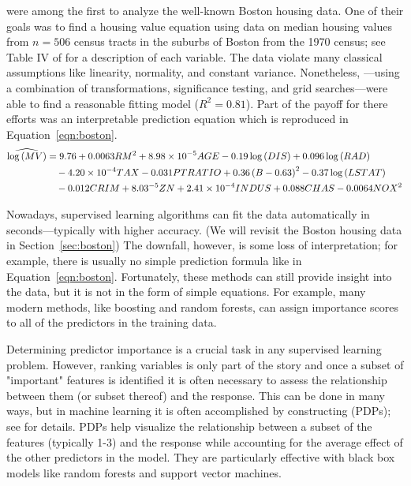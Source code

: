 \citet{harrison-1978-hedonic} were among the first to analyze the well-known Boston housing data. One of their goals was to find a housing value equation using data on median housing values from $n = 506$ census tracts in the suburbs of Boston from the 1970 census; see Table IV of \citet{harrison-1978-hedonic} for a description of each variable. The data violate many classical assumptions like linearity, normality, and constant variance. Nonetheless, \citeauthor{harrison-1978-hedonic}---using a combination of transformations, significance testing, and grid searches---were able to find a reasonable fitting model ($R^2 = 0.81$). Part of the payoff for there efforts was an interpretable prediction equation which is reproduced in Equation~\eqref{eqn:boston}.
\begin{equation}
\label{eqn:boston}
\begin{split}
\widehat{\log\left(MV\right)} &= 9.76 + 0.0063 RM^2 + 8.98\times10^{-5} AGE - 0.19\log\left(DIS\right) + 0.096\log\left(RAD\right) \\
  & \quad - 4.20\times10^{-4} TAX - 0.031 PTRATIO + 0.36\left(B - 0.63\right)^2 - 0.37\log\left(LSTAT\right) \\
  & \quad - 0.012 CRIM + 8.03\time10^{-5} ZN + 2.41\times10^{-4}  INDUS + 0.088 CHAS - 0.0064 NOX^2
\end{split}
\end{equation}

Nowadays, supervised learning algorithms can fit the data automatically in seconds---typically with higher accuracy. (We will revisit the Boston housing data in Section~\ref{sec:boston}) The downfall, however, is some loss of interpretation; for example, there is usually no simple prediction formula like in Equation~\eqref{eqn:boston}. Fortunately, these methods can still provide insight into the data, but it is not in the form of simple equations. For example, many modern methods, like boosting and random forests, can assign importance scores to all of the predictors in the training data.

Determining predictor importance is a crucial task in any supervised learning problem. However, ranking variables is only part of the story and once a subset of "important" features is identified it is often necessary to assess the relationship between them (or subset thereof) and the response. This can be done in many ways, but in machine learning it is often accomplished by constructing  (PDPs); see \citet{friedman-2000-greedy} for details. PDPs help visualize the relationship between a subset of the features (typically 1-3) and the response while accounting for the average effect of the other predictors in the model. They are particularly effective with black box models like random forests and support vector machines.

